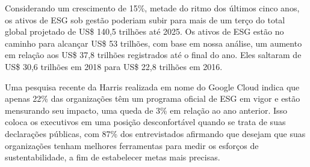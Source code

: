\documentclass{article}
\begin{document}
	Considerando um crescimento de 15\%, metade do ritmo dos últimos cinco anos, os ativos de ESG sob gestão poderiam subir para mais de um terço do total global projetado de US\$ 140,5 trilhões até 2025. Os ativos de ESG estão no caminho para alcançar US\$ 53 trilhões, com base em nossa análise, um aumento em relação aos US\$ 37,8 trilhões registrados até o final do ano. Eles saltaram de US\$ 30,6 trilhões em 2018 para US\$ 22,8 trilhões em 2016. \cite{}
	
	Uma pesquisa recente da Harris realizada em nome do Google Cloud indica que apenas 22\% das organizações têm um programa oficial de ESG em vigor e estão mensurando seu impacto, uma queda de 3\% em relação ao ano anterior. Isso coloca os executivos em uma posição desconfortável quando se trata de suas declarações públicas, com 87\% dos entrevistados afirmando que desejam que suas organizações tenham melhores ferramentas para medir os esforços de sustentabilidade, a fim de estabelecer metas mais precisas.
\end{document}
